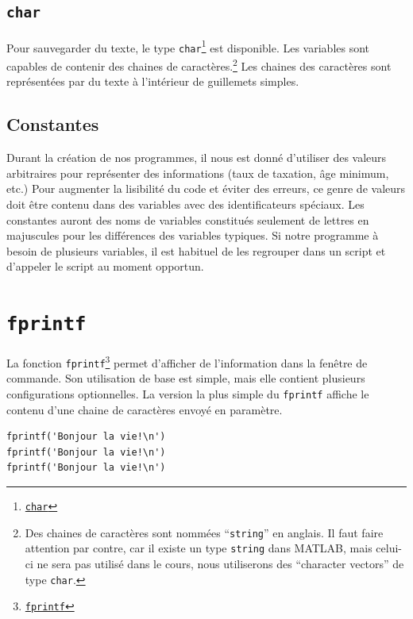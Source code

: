 \documentclass[]{tufte-handout}
\begin{document}
\hypertarget{char}{%
\subsection{\texorpdfstring{\texttt{char}}{char}}\label{char}}

Pour sauvegarder du texte, le type \texttt{char}\footnote{\href{https://www.mathworks.com/help/matlab/ref/char.html}{\texttt{char}}}
est disponible. Les variables sont capables de contenir des chaines de
caractères.\footnote{Des chaines de caractères sont nommées
  ``\texttt{string}'' en anglais. Il faut faire attention par contre,
  car il existe un type \texttt{string} dans MATLAB, mais celui-ci ne
  sera pas utilisé dans le cours, nous utiliserons des ``character
  vectors'' de type \texttt{char}.} Les chaines des caractères sont
représentées par du texte à l'intérieur de guillemets simples.

\hypertarget{constantes}{%
\subsection{Constantes}\label{constantes}}

Durant la création de nos programmes, il nous est donné d'utiliser des
valeurs arbitraires pour représenter des informations (taux de taxation,
âge minimum, etc.) Pour augmenter la lisibilité du code et éviter des
erreurs, ce genre de valeurs doit être contenu dans des variables avec
des identificateurs spéciaux. Les constantes auront des noms de
variables constitués seulement de lettres en majuscules pour les
différences des variables typiques. Si notre programme à besoin de
plusieurs variables, il est habituel de les regrouper dans un script et
d'appeler le script au moment opportun.

\hypertarget{fprintf}{%
\section{\texorpdfstring{\texttt{fprintf}}{fprintf}}\label{fprintf}}

La fonction \texttt{fprintf}\footnote{\href{https://www.mathworks.com/help/matlab/ref/fprintf.html}{\texttt{fprintf}}}
permet d'afficher de l'information dans la fenêtre de commande. Son
utilisation de base est simple, mais elle contient plusieurs
configurations optionnelles. La version la plus simple du
\texttt{fprintf} affiche le contenu d'une chaine de caractères envoyé en
paramètre.

\begin{lstlisting}
fprintf('Bonjour la vie!\n')
fprintf('Bonjour la vie!\n')
fprintf('Bonjour la vie!\n')
\end{lstlisting}
\end{document}
